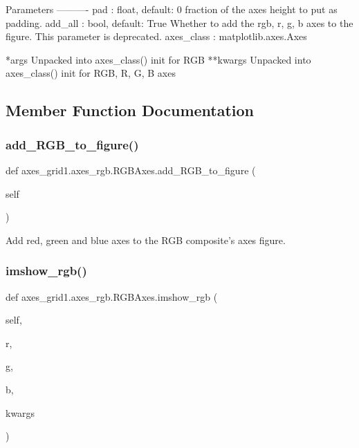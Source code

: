 \begin{DoxyVerb}Parameters
----------
pad : float, default: 0
    fraction of the axes height to put as padding.
add_all : bool, default: True
    Whether to add the {rgb, r, g, b} axes to the figure.
    This parameter is deprecated.
axes_class : matplotlib.axes.Axes

*args
    Unpacked into axes_class() init for RGB
**kwargs
    Unpacked into axes_class() init for RGB, R, G, B axes
\end{DoxyVerb}
 

\subsection{Member Function Documentation}
\mbox{\label{classaxes__grid1_1_1axes__rgb_1_1RGBAxes_abe7cb6462c1e1bedabed3442cd61448e}} 
\subsubsection{\texorpdfstring{add\+\_\+\+R\+G\+B\+\_\+to\+\_\+figure()}{add\_RGB\_to\_figure()}}
{\footnotesize\ttfamily def axes\+\_\+grid1.\+axes\+\_\+rgb.\+R\+G\+B\+Axes.\+add\+\_\+\+R\+G\+B\+\_\+to\+\_\+figure (\begin{DoxyParamCaption}\item[{}]{self }\end{DoxyParamCaption})}

\begin{DoxyVerb}Add red, green and blue axes to the RGB composite's axes figure.\end{DoxyVerb}
 \mbox{\label{classaxes__grid1_1_1axes__rgb_1_1RGBAxes_acec2df179d3849087b8284be3bacbb0d}} 
\subsubsection{\texorpdfstring{imshow\+\_\+rgb()}{imshow\_rgb()}}
{\footnotesize\ttfamily def axes\+\_\+grid1.\+axes\+\_\+rgb.\+R\+G\+B\+Axes.\+imshow\+\_\+rgb (\begin{DoxyParamCaption}\item[{}]{self,  }\item[{}]{r,  }\item[{}]{g,  }\item[{}]{b,  }\item[{}]{kwargs }\end{DoxyParamCaption})}

